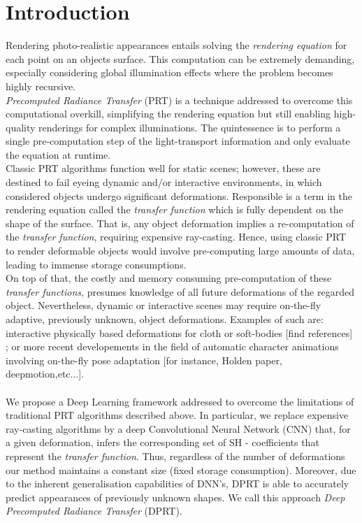 \section{Introduction}

Rendering photo-realistic appearances entails solving the \textit{rendering equation} for each point on an objects surface. This computation can be extremely demanding, especially considering global illumination effects where the problem becomes highly recursive. \\
\textit{Precomputed Radiance Transfer} (PRT) is a technique addressed to overcome this computational overkill, simplifying the rendering equation but still enabling high-quality renderings for complex illuminations. The quintessence is to perform a single pre-computation step of the light-transport information and only evaluate the equation at runtime.\\
Classic PRT algorithms function well for static scenes; however, these are destined to fail eyeing dynamic and/or interactive environments, in which considered objects undergo significant deformations.
Responsible is a term in the rendering equation called the \textit{transfer function} which is fully dependent on the shape of the surface. That is, any object deformation implies a re-computation of the \textit{transfer function},  requiring expensive ray-casting. Hence, using classic PRT to render deformable objects would involve pre-computing large amounts of data, leading to immense storage consumptions. \\
On top of that, the costly and memory consuming pre-computation of these \textit{transfer functions}, presumes knowledge of all future deformations of the regarded object. Nevertheless, dynamic or interactive scenes may require on-the-fly adaptive, previously unknown, object deformations. Examples of such are: 
interactive physically based deformations for cloth or soft-bodies [find references] ; 
or more recent developements in the field of automatic character animations involving on-the-fly pose adaptation [for instance, Holden paper, deepmotion,etc...]. \\
\\
We propose a Deep Learning framework addressed to overcome the limitations of traditional PRT algorithms described above. In particular, we replace expensive ray-casting algorithms by a deep Convolutional Neural Network (CNN) that, for a given deformation, infers the corresponding set of SH - coefficients that represent the \textit{transfer function}. 
Thus, regardless of the number of deformations our method maintains a constant size (fixed storage consumption). Moreover, due to the inherent generalisation capabilities of DNN's, DPRT is able to accurately predict appearances of previously unknown shapes. We call this approach \textit{Deep Precomputed Radiance Transfer} (DPRT). \\
